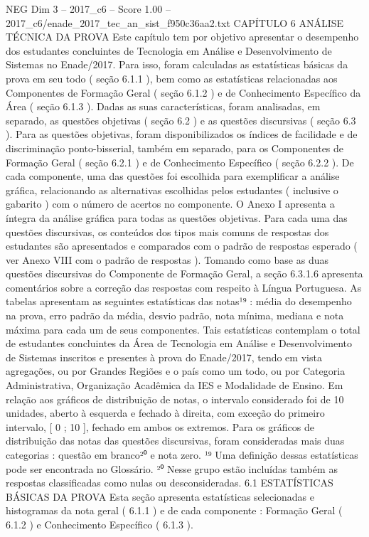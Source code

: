 \begin{textsample}{NEG Dim 3 – 2017\_c6 – Score 1.00 – 2017\_c6/enade\_2017\_tec\_an\_sist\_f950c36aa2.txt}  \label{ex:f3_neg_093}
CAPÍTULO 6 ANÁLISE TÉCNICA DA PROVA Este capítulo tem por objetivo apresentar o desempenho dos estudantes concluintes de Tecnologia em Análise e Desenvolvimento de Sistemas no Enade/2017.
Para isso, foram calculadas as estatísticas básicas da prova em seu todo ( seção 6.1.1 ), bem como as estatísticas relacionadas aos Componentes de Formação Geral ( seção 6.1.2 ) e de Conhecimento Específico da Área ( seção 6.1.3 ).
Dadas as suas características, foram analisadas, em separado, as questões objetivas ( seção 6.2 ) e as questões discursivas ( seção 6.3 ).
Para as questões objetivas, foram disponibilizados os índices de facilidade e de discriminação ponto-bisserial, também em separado, para os Componentes de Formação Geral ( seção 6.2.1 ) e de Conhecimento Específico ( seção 6.2.2 ).
De cada componente, uma das questões foi escolhida para exemplificar a análise gráfica, relacionando as alternativas escolhidas pelos estudantes ( inclusive o gabarito ) com o número de acertos no componente.
O Anexo I apresenta a íntegra da análise gráfica para todas as questões objetivas.
Para cada uma das questões discursivas, os conteúdos dos tipos mais comuns de respostas dos estudantes são apresentados e comparados com o padrão de respostas esperado ( ver Anexo VIII com o padrão de respostas ).
Tomando como base as duas questões discursivas do Componente de Formação Geral, a seção 6.3.1.6 apresenta comentários sobre a correção das respostas com respeito à Língua Portuguesa.
As tabelas apresentam as seguintes estatísticas das notas¹⁹ : média do desempenho na prova, erro padrão da média, desvio padrão, nota mínima, mediana e nota máxima para cada um de seus componentes.
Tais estatísticas contemplam o total de estudantes concluintes da Área de Tecnologia em Análise e Desenvolvimento de Sistemas inscritos e presentes à prova do Enade/2017, tendo em vista agregações, ou por Grandes Regiões e o país como um todo, ou por Categoria Administrativa, Organização Acadêmica da IES e Modalidade de Ensino.
Em relação aos gráficos de distribuição de notas, o intervalo considerado foi de 10 unidades, aberto à esquerda e fechado à direita, com exceção do primeiro intervalo, [ 0 ; 10 ], fechado em ambos os extremos.
Para os gráficos de distribuição das notas das questões discursivas, foram consideradas mais duas categorias : questão em branco²⁰ e nota zero. ¹⁹ Uma definição dessas estatísticas pode ser encontrada no Glossário. ²⁰ Nesse grupo estão incluídas também as respostas classificadas como nulas ou desconsideradas. 6.1 ESTATÍSTICAS BÁSICAS DA PROVA Esta seção apresenta estatísticas selecionadas e histogramas da nota geral ( 6.1.1 ) e de cada componente : Formação Geral ( 6.1.2 ) e Conhecimento Específico ( 6.1.3 ).

\end{textsample}

